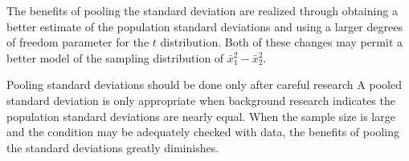 The benefits of pooling the standard deviation are realized through obtaining a better estimate of the population standard deviations and using a larger degrees of freedom parameter for the $t$ distribution. Both of these changes may permit a better model of the sampling distribution of $\bar{x}_1^2 - \bar{x}_2^2$.

\begin{caution}
{Pooling standard deviations should be done only after careful research}
{A pooled standard deviation is only appropriate when background research indicates the population standard deviations are nearly equal. When the sample size is large and the condition may be adequately checked with data, the benefits of pooling the standard deviations greatly diminishes.}
\end{caution}




